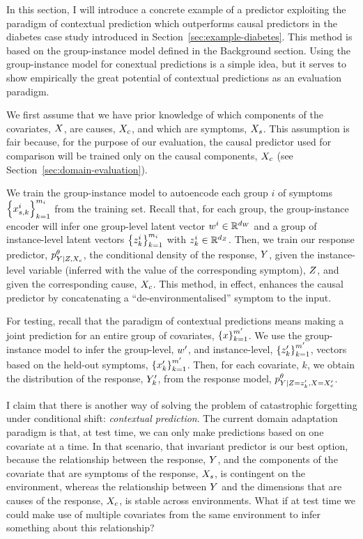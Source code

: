 \documentclass[../thesis.tex]{subfiles}
\begin{document}
In this section, I will introduce a concrete example of a predictor exploiting the paradigm of contextual prediction which outperforms causal predictors in the diabetes case study introduced in Section~\ref{sec:example-diabetes}. This method is based on the group-instance model defined in the Background section. Using the group-instance model for conextual predictions is a simple idea, but it serves to show empirically the great potential of contextual predictions as an evaluation paradigm.

We first assume that we have prior knowledge of which components of the covariates, $\myrv{x}$, are causes, $\myrv{x}_{c}$, and which are symptoms, $\myrv{x}_{s}$. This assumption is fair because, for the purpose of our evaluation, the causal predictor used for comparison will be trained only on the causal components, $\myrv{x}_c$ (see Section~\ref{sec:domain-evaluation}).

We train the group-instance model to autoencode each group $i$ of symptoms $\left\{x^i_{s, k}\right\}_{k=1}^{m_i}$ from the training set. Recall that, for each group, the group-instance encoder will infer one group-level latent vector $\myvect{w}^i \in \mathbb{R}^{\mydim{w}}$ and a group of instance-level latent vectors $\left\{ z^i_{k} \right\}_{k=1}^{m_i}$ with $\myvect{z}^i_{k} \in \mathbb{R}^{\mydim{z}}$. Then, we train our response predictor, $\myfunc{p}^{\theta}_{\myrv{y} | \myrv{z}, \myrv{x}_c}$, the conditional density of the response, $\myrv{y}$, given the instance-level variable (inferred with the value of the corresponding symptom), $\myrv{z}$, and given the corresponding cause, $\myrv{x}_c$. This method, in effect, enhances the causal predictor by concatenating a ``de-environmentalised'' symptom to the input.

For testing, recall that the paradigm of contextual predictions means making a joint prediction for an entire group of covariates, $\left\{ x \right\}_{k=1}^{m'}$. We use the group-instance model to infer the group-level, $w'$, and instance-level, $\left\{ z'_{k} \right\}_{k=1}^{m'}$, vectors based on the held-out symptoms, $\left\{ x'_{k} \right\}_{k=1}^{m'}$. Then, for each covariate, $k$, we obtain the distribution of the response, $\myrv{y}'_k$, from the response model, $\myfunc{p}^{\theta}_{\myrv{y} | \myrv{z} = \myvect{z}'_k, \myrv{X} = \myrv{x}'_{c}}$.

I claim that there is another way of solving the problem of catastrophic forgetting under conditional shift: \textit{contextual prediction}. The current domain adaptation paradigm is that, at test time, we can only make predictions based on one covariate at a time. In that scenario, that invariant predictor is our best option, because the relationship between the response, $\myrv{y}$, and the components of the covariate that are symptoms of the response, $\myrv{x}_{s}$, is contingent on the environment, whereas the relationship between $\myrv{y}$ and the dimensions that are causes of the response, $\myrv{x}_{c}$, is stable across environments. What if at test time we could make use of multiple covariates from the same environment to infer something about this relationship?
\end{document}
